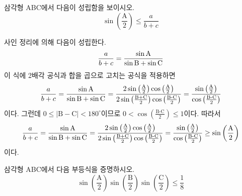 \documentclass[11pt, a4paper]{book}
\begin{document}
\begin{example}\label{exam:sineeq}
	삼각형 \textrm{ABC}에서 다음이 성립함을 보이시오.
	\[
	\sin\left(\frac{\textrm{A}}{2}\right) \leq \frac{a}{b+c}
	\]
	\begin{solution}
		사인 정리에 의해 다음이 성립한다.
		\[
		\frac{a}{b+c} = \frac{\sin \textrm{A}}{\sin \textrm{B}+\sin \textrm{C}}
		\]
		이 식에 2배각 공식과 합을 곱으로 고치는 공식을 적용하면
		\[
		\frac{a}{b+c} = \frac{\sin \textrm{A}}{\sin \textrm{B}+\sin \textrm{C}}=\frac{2\sin\left(\frac{\textrm{A}}{2}\right) \cos\left(\frac{\textrm{A}}{2}\right)}{2\sin\left(\frac{\textrm{B+C}}{2}\right)\cos\left(\frac{\textrm{B-C}}{2}\right)} = \frac{\sin\left(\frac{\textrm{A}}{2}\right)}{\cos\left(\frac{\textrm{B-C}}{2}\right)}
		\]
		이다. 그런데 $0\leq \vert \textrm{B} - \textrm{C} \vert<180^{\circ}$이므로 $0<\cos\left(\frac{\textrm{B-C}}{2}\right) \leq 1$이다. 따라서
		\[
		\frac{a}{b+c} = \frac{\sin \textrm{A}}{\sin \textrm{B}+\sin \textrm{C}}=\frac{2\sin\left(\frac{\textrm{A}}{2}\right) \cos\left(\frac{\textrm{A}}{2}\right)}{2\sin\left(\frac{\textrm{B+C}}{2}\right)\cos\left(\frac{\textrm{B-C}}{2}\right)} = \frac{\sin\left(\frac{\textrm{A}}{2}\right)}{\cos\left(\frac{\textrm{B-C}}{2}\right)} \geq \sin\left(\frac{\textrm{A}}{2}\right)
		\]
		이다.
	\end{solution}	
\end{example}
\begin{problem}
	삼각형 \textrm{ABC}에서 다음 부등식을 증명하시오.
	\begin{equation*}
		\sin\left(\frac{\textrm{A}}{2}\right)\sin\left(\frac{\textrm{B}}{2}\right)\sin\left(\frac{\textrm{C}}{2}\right) \leq \frac{1}{8}
	\end{equation*}
\end{problem}
\end{document}
